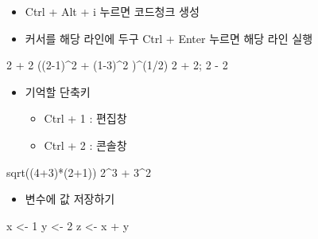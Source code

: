 \documentclass[
]{book}
\newenvironment{Shaded}{\begin{snugshade}}{\end{snugshade}}
\newcommand{\DecValTok}[1]{\textcolor[rgb]{0.00,0.00,0.81}{#1}}
\newcommand{\FunctionTok}[1]{\textcolor[rgb]{0.00,0.00,0.00}{#1}}
\newcommand{\NormalTok}[1]{#1}
\newcommand{\OtherTok}[1]{\textcolor[rgb]{0.56,0.35,0.01}{#1}}
\newcommand{\SpecialCharTok}[1]{\textcolor[rgb]{0.00,0.00,0.00}{#1}}
\providecommand{\tightlist}{%
  \setlength{\itemsep}{0pt}\setlength{\parskip}{0pt}}
\begin{document}
\begin{itemize}
\tightlist
\item
  Ctrl + Alt + i 누르면 코드청크 생성
\item
  커서를 해당 라인에 두구 Ctrl + Enter 누르면 해당 라인 실행
\end{itemize}

\begin{Shaded}
\begin{Highlighting}[]
\DecValTok{2} \SpecialCharTok{+} \DecValTok{2}
\NormalTok{((}\DecValTok{2{-}1}\NormalTok{)}\SpecialCharTok{\^{}}\DecValTok{2} \SpecialCharTok{+}\NormalTok{ (}\DecValTok{1{-}3}\NormalTok{)}\SpecialCharTok{\^{}}\DecValTok{2}\NormalTok{ )}\SpecialCharTok{\^{}}\NormalTok{(}\DecValTok{1}\SpecialCharTok{/}\DecValTok{2}\NormalTok{)}
\DecValTok{2} \SpecialCharTok{+} \DecValTok{2}\NormalTok{; }\DecValTok{2} \SpecialCharTok{{-}} \DecValTok{2}
\end{Highlighting}
\end{Shaded}

\begin{itemize}
\tightlist
\item
  기억할 단축키

  \begin{itemize}
  \tightlist
  \item
    Ctrl + 1 : 편집창
  \item
    Ctrl + 2 : 콘솔창
  \end{itemize}
\end{itemize}

\begin{Shaded}
\begin{Highlighting}[]
\FunctionTok{sqrt}\NormalTok{((}\DecValTok{4}\SpecialCharTok{+}\DecValTok{3}\NormalTok{)}\SpecialCharTok{*}\NormalTok{(}\DecValTok{2}\SpecialCharTok{+}\DecValTok{1}\NormalTok{))}
\DecValTok{2}\SpecialCharTok{\^{}}\DecValTok{3} \SpecialCharTok{+} \DecValTok{3}\SpecialCharTok{\^{}}\DecValTok{2}
\end{Highlighting}
\end{Shaded}

\begin{itemize}
\tightlist
\item
  변수에 값 저장하기
\end{itemize}

\begin{Shaded}
\begin{Highlighting}[]
\NormalTok{x }\OtherTok{\textless{}{-}} \DecValTok{1}
\NormalTok{y }\OtherTok{\textless{}{-}} \DecValTok{2}
\NormalTok{z }\OtherTok{\textless{}{-}}\NormalTok{ x }\SpecialCharTok{+}\NormalTok{ y}
\end{Highlighting}
\end{Shaded}
\end{document}
